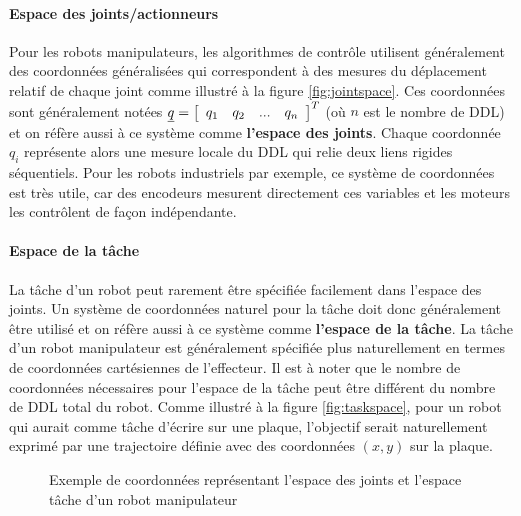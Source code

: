 \paragraph{Espace des joints/actionneurs}

Pour les robots manipulateurs, les algorithmes de contrôle utilisent généralement des coordonnées généralisées qui correspondent à des mesures du déplacement relatif de chaque joint comme illustré à la figure \ref{fig:jointspace}. Ces coordonnées sont généralement notées $\underline{q} = \left[ \begin{array}{cccc} q_1 & q_2 & ... & q_n \end{array} \right]^T$ (où $n$ est le nombre de DDL) et on réfère aussi à ce système comme \textbf{l'espace des joints}. Chaque coordonnée $q_i$ représente alors une mesure locale du DDL qui relie deux liens rigides séquentiels. Pour les robots industriels par exemple, ce système de coordonnées est très utile, car des encodeurs mesurent directement ces variables et les moteurs les contrôlent de façon indépendante.

\paragraph{Espace de la tâche}

La tâche d'un robot peut rarement être spécifiée facilement dans l'espace des joints. Un système de coordonnées naturel pour la tâche doit donc généralement être utilisé et on réfère aussi à ce système comme \textbf{l'espace de la tâche}. La tâche d'un robot manipulateur est généralement spécifiée plus naturellement en termes de coordonnées cartésiennes de l'effecteur. Il est à noter que le nombre de coordonnées nécessaires pour l'espace de la tâche peut être différent du nombre de DDL total du robot. Comme illustré à la figure \ref{fig:taskspace}, pour un robot qui aurait comme tâche d'écrire sur une plaque, l'objectif serait naturellement exprimé par une trajectoire définie avec des coordonnées $(x,y)$ sur la plaque.

\begin{figure}[htbp]
	\centering
	\hspace{+20pt}
	\caption{Exemple de coordonnées représentant l'espace des joints et l'espace tâche d'un robot manipulateur}
	\label{fig:spaces}
\end{figure}


